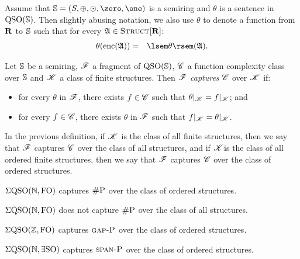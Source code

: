 
Assume that $\SR = (S, \adds, \mults, \zero, \one)$ is a semiring and $\theta$ is a sentence in ${\rm QSO}(\mathbb{S})$. Then slightly abusing notation, we also use $\theta$ to denote a function from $\mathbf{R}$ to $\mathbb{S}$ such that for every $\mathfrak{A} \in \text{\sc Struct}[\mathbf{R}] $:
\begin{eqnarray*}
\theta(\enc(\A)) & = & \sem{\theta}(\A).
\end{eqnarray*}
\begin{definition}
Let $\mathbb{S}$ be a semiring, $\mathscr{F}$ a fragment of ${\rm QSO}(\mathbb{S})$, $\mathscr{C}$ a function complexity class over $\mathbb{S}$ and $\mathscr{K}$ a class of finite structures. Then $\mathscr{F}$ {\em captures} $\mathscr{C}$ over $\mathscr{K}$ if:
\begin{itemize}
\item for every $\theta$ in $\mathscr{F}$, there exists $f \in \mathscr{C}$ such that $\theta|_{\mathscr{K}} = f|_{\mathscr{K}}$; and

\item for every $f \in \mathscr{C}$, there exists $\theta$ in $\mathscr{F}$ such that $f|_{\mathscr{K}} = \theta|_{\mathscr{K}}$.
\end{itemize}
\end{definition}
In the previous definition, if $\mathscr{K}$ is the class of all finite structures, then we say that $\mathscr{F}$ captures $\mathscr{C}$ over the class of all structures, and if $\mathscr{K}$is the class of all ordered finite structures, then we say that $\mathscr{F}$ captures $\mathscr{C}$ over the class of ordered structures. 
\begin{theorem}
$\Sigma{\rm QSO}(\mathbb{N},{\rm FO})$ captures $\text{\sc \#P}$ over the class of ordered structures.
\end{theorem}

\begin{proposition}
$\Sigma{\rm QSO}(\mathbb{N},{\rm FO})$ does not capture $\text{\sc \#P}$ over the class of all structures.
\end{proposition}

\begin{theorem}
$\Sigma{\rm QSO}(\mathbb{Z},{\rm FO})$ captures $\text{\sc gap-P}$ over the class of ordered structures.
\end{theorem}


\begin{theorem}
$\Sigma{\rm QSO}(\mathbb{N},\exists{\rm SO})$ captures $\text{\sc span-P}$ over the class of ordered structures.
\end{theorem}
